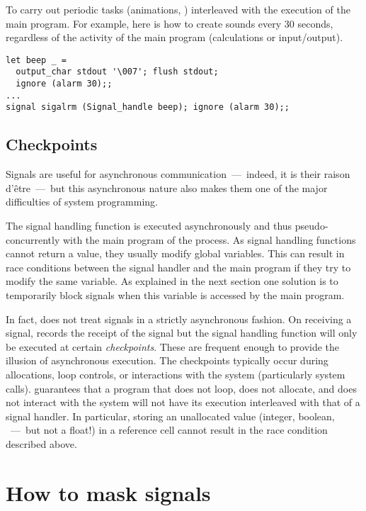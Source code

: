 \begin{example} 
\label{ex/beep}
To carry out periodic tasks (animations, \etc) interleaved with
the execution of the main program.  For example, here is how
to create  sounds every 30 seconds, regardless of
the activity of the main program (calculations or input/output).

\begin{lstlisting}
let beep _ = 
  output_char stdout '\007'; flush stdout; 
  ignore (alarm 30);;
...
signal sigalrm (Signal_handle beep); ignore (alarm 30);;
\end{lstlisting}
\end{example}

\subsection*{Checkpoints}

Signals are useful for asynchronous communication~---~indeed, it is
their raison d'\^etre~---~but this asynchronous nature also makes them
one of the major difficulties of system programming.

The signal handling function is executed asynchronously and thus
pseudo-concurrently with the main program of the process.  As signal
handling functions cannot return a value, they usually modify global
variables. This can result in race conditions between the signal
handler and the main program if they try to modify the same variable.
As explained in the next section one solution is to temporarily block
signals when this variable is accessed by the main program.

In fact, {\ocaml} does not treat signals in a strictly asynchronous
fashion.  On receiving a signal, {\ocaml} records the receipt of the
signal but the signal handling function will only be executed at
certain \emph{checkpoints}.  These are frequent enough to provide the
illusion of asynchronous execution.  The checkpoints typically occur
during allocations, loop controls, or interactions with the system
(particularly system calls). {\ocaml} guarantees that a program that
does not loop, does not allocate, and does not interact with the
system will not have its execution interleaved with that of a
signal handler. In particular, storing an unallocated value (integer,
boolean, \etc{}~---~but not a float!) in a reference cell cannot
result in the race condition described above.

\section{How to mask signals}

